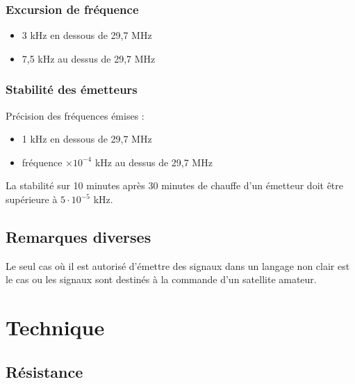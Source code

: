 \documentclass[a4paper,12pt,oneside]{report} %
\begin{document}
			\subsection{Excursion de fréquence}
			\begin{itemize}
				\item 3 kHz en dessous de 29,7 MHz
				\item 7,5 kHz au dessus de 29,7 MHz
			\end{itemize}
			
			\subsection{Stabilité des émetteurs}
			Précision des fréquences émises :
			\begin{itemize}
				\item 1 kHz en dessous de 29,7 MHz
				\item fréquence $ \times 10^{-4}$ kHz au dessus de 29,7 MHz
			\end{itemize}
			
			La stabilité sur 10 minutes après 30 minutes de chauffe d'un émetteur doit être supérieure à $5 \cdot 10^{-5}$ kHz.
			
			\section{Remarques diverses}
			Le seul cas où il est autorisé d'émettre des signaux dans un langage non clair est le cas ou les signaux sont destinés à la commande d'un satellite amateur.
	
	\chapter{Technique}
		\section{Résistance}
		
\end{document}

